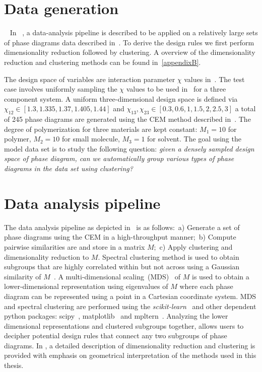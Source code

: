 \section{Data generation}~\label{sec:htedata}
In ~, a data-analysis pipeline is described to be applied on a relatively large sets of phase diagrams data described in~.
To derive the design rules we first perform dimensionality reduction followed by clustering. A overview of the dimensionality reduction and clustering methods can be found in~\ref{appendixB}.

The design space of variables are interaction parameter \(\chi\) values in~.
The test case involves uniformly sampling the \(\chi\) values to be used in~ for a three component system. 
A uniform three-dimensional design space is defined via \(\chi_{12}\in[1.3,1.335,1.37,1.405,1.44]\) and 
\(\chi_{13}, \chi_{23}\in[0.3,0.6,1,1.5,2,2.5,3]\) a total of 245 phase diagrams are generated using the CEM method described in~. 
The degree of polymerization for three materials are kept constant: $M_1=10$ for polymer, $M_2=10$ for small molecule, $M_3=1$ for solvent.
The goal using the model data set is to study the following question: \textit{given a densely sampled design space of phase diagram, can we automatically group various types of phase diagrams in the data set using clustering?}

\section{Data analysis pipeline}\label{sec:pipeline}
The data analysis pipeline as depicted in~ is as follows:~a) Generate a set of phase diagrams using the CEM in a high-throughput manner;~b) Compute pairwise similarities are and store in a matrix \(M\);~c) Apply clustering and dimensionality reduction to \(M\).
Spectral clustering method is used to obtain subgroups that are highly correlated within but not across using a Gaussian similarity of \(M\)~\cite{SpectralClustering}. 
A multi-dimensional scaling~(MDS)~\cite{ESL} of \(M\) is used to obtain a lower-dimensional representation using eigenvalues of \(M\) where each phase diagram can be represented using a point in a Cartesian coordinate system.
MDS and spectral clustering are performed using the \textit{scikit-learn}~\cite{sklearn} and other dependent python packages: scipy~\cite{scipy}, matplotlib~\cite{matplotlib} and mpltern~\cite{mpltern}.
Analyzing the lower dimensional representations and clustered subgroups together, allows users to decipher potential design rules that connect any two subgroups of phase diagrams. In , a detailed description of dimensionality reduction and clustering is provided with emphasis on geometrical interpretation of the methods used in this thesis.

